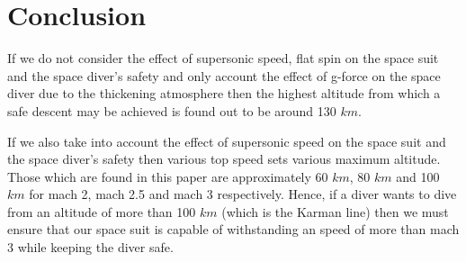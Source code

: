 \documentclass[a4paper, 14pt]{extarticle}
\begin{document}
\section{Conclusion}
If we do not consider the effect of supersonic speed, flat spin on the space suit and the space diver’s safety and only account the effect of g-force on the space diver due to the thickening atmosphere then the highest altitude from which a safe descent may be achieved is found out to be around 130 $km$.

If we also take into account the effect of supersonic speed on the space suit and the space diver’s safety then various top speed sets various maximum altitude. Those which are found in this paper are approximately 60 $km$, 80 $km$ and 100 $km$ for mach 2, mach 2.5 and mach 3 respectively. Hence, if a diver wants to dive from an altitude of more than 100 $km$ (which is the Karman line) then we must ensure that our space suit is capable of withstanding an speed of more than mach 3 while keeping the diver safe.


\newpage
\end{document}
